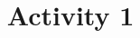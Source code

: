 \documentclass[12pt]{amsart}
\title{Activity 1}
\begin{document}
\begin{enumerate}


  

\end{enumerate}
\end{document}
